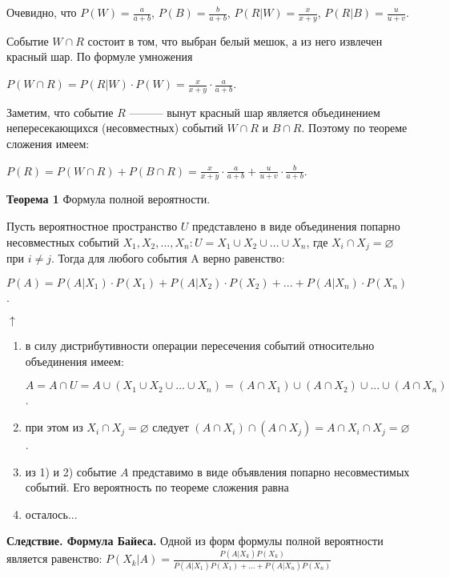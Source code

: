 \documentclass{article}
\begin{document}
    Очевидно, что \(P(W) = \frac{a}{a + b}\), \(P(B) = \frac{b}{a + b}\), \(P(R|W) = \frac{x}{x + y}\), \(P(R|B) = \frac{u}{u + v}\). 

    Событие \(W \cap R\) состоит в том, что выбран белый мешок, а из него извлечен красный шар. По формуле умножения

    \(P(W \cap R) = P(R|W) \cdot P(W) = \frac{x}{x + y} \cdot \frac{a}{a + b}\).

    Заметим, что событие $R$ ——— вынут красный шар является объединением непересекающихся (несовместных) событий \(W \cap R\) и \(B \cap R\).
    Поэтому по теореме сложения имеем:

    \(P(R) = P(W \cap R) + P(B \cap R) = \frac{x}{x + y} \cdot \frac{a}{a + b} + \frac{u}{u + v} \cdot \frac{b}{a + b}\).


    \textbf{Теорема 1} Формула полной вероятности.

    Пусть вероятностное пространство $U$ представлено в виде объединения попарно несовместных событий \(X_1, X_2,..., X_n: U = X_1 \cup X_2 \cup ... \cup X_n\), где \(X_i \cap X_j = \varnothing\) при \(i \not = j\). 
    Тогда для любого события A верно равенство:

    \(P(A) = P(A|X_1) \cdot P(X_1) + P(A|X_2) \cdot P(X_2) + ... + P(A|X_n) \cdot P(X_n)\).

    \(\uparrow\)
    \begin{enumerate}
        \item в силу дистрибутивности операции пересечения событий относительно объединения имеем:
        
        \(A = A \cap U = A \cup (X_1 \cup X_2 \cup ... \cup X_n) = (A \cap X_1) \cup (A \cap X_2) \cup ... \cup (A \cap X_n)\).

        \item при этом из \(X_i \cap X_j = \varnothing\) следует \( (A \cap X_i) \cap (A \cap X_j) = A \cap X_i \cap X_j = \varnothing\).
        \item из 1) и 2) событие $A$ представимо в виде объявления попарно несовместимых событий. Его вероятность по теореме сложения равна %
        \item осталось... %
    \end{enumerate}



    \textbf{Следствие. Формула Байеса.} Одной из форм формулы полной вероятности является равенство: \( P(X_k|A) = \frac{P(A|X_k )P(X_k)}{P(A|X_1)P(X_1)+...+ P(A|X_n)P(X_n)} \)
\end{document}
